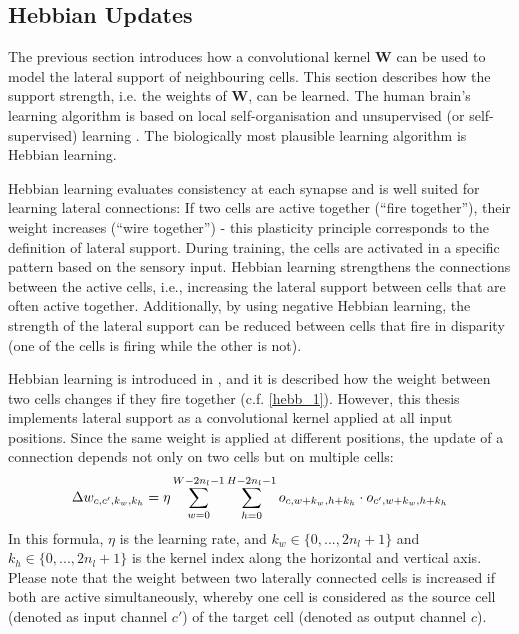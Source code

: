\subsection{Hebbian Updates}
The previous section introduces how a convolutional kernel $\boldsymbol{W}$ can be used to model the lateral support of neighbouring cells.
This section describes how the support strength, i.e. the weights of $\boldsymbol{W}$, can be learned.
The human brain's learning algorithm is based on local self-organisation and unsupervised (or self-supervised) learning . The biologically most plausible learning algorithm is Hebbian learning.

Hebbian learning evaluates consistency at each synapse and is well suited for learning lateral connections: If two cells are active together (``fire together''), their weight increases (``wire together'') - this plasticity principle corresponds to the definition of lateral support. During training, the cells are activated in a specific pattern based on the sensory input. Hebbian learning strengthens the connections between the active cells, i.e., increasing the lateral support between cells that are often active together. Additionally, by using negative Hebbian learning, the strength of the lateral support can be reduced between cells that fire in disparity (one of the cells is firing while the other is not).

Hebbian learning is introduced in , and it is described how the weight between two cells changes if they fire together (c.f. \eqref{hebb_1}).
However, this thesis implements lateral support as a convolutional kernel applied at all input positions.
Since the same weight is applied at different positions, the update of a connection depends not only on two cells but on multiple cells:
%
\begin{align}\eqlbl{hebbu_1}
	\Delta w_{c, c',k_w,k_h} = \eta \sum_{w = 0}^{W - 2n_l - 1} \sum_{h = 0}^{H - 2n_l - 1} o_{c,w+k_w,h+k_h} \cdot o_{c',w+k_w,h+k_h}
\end{align}
%
In this formula, $\eta$ is the learning rate, and $k_w \in \{0, ..., 2n_l+1\}$ and $k_h\in \{0, ..., 2n_l+1 \}$ is the kernel index along the horizontal and vertical axis.
Please note that the weight between two laterally connected cells is increased if both are active simultaneously, whereby one cell is considered as the source cell (denoted as input channel $c'$) of the target cell (denoted as output channel $c$).

